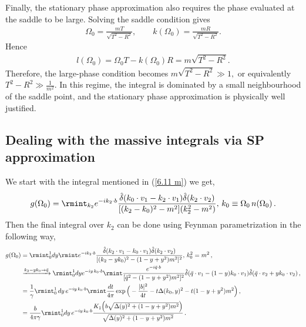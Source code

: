 {{Finally, the stationary phase approximation also requires the phase evaluated at the saddle to be large. Solving the saddle condition gives
\begin{align}
    \Omega_0
    =
    \frac{mT}{\sqrt{T^2-R^2}},
    \qquad
    k(\Omega_0)
    =
    \frac{mR}{\sqrt{T^2-R^2}} .
\end{align}
Hence
\begin{align}
    l(\Omega_0)
    =
    \Omega_0 T-k(\Omega_0)R
    =
    m\sqrt{T^2-R^2}.
\end{align}
Therefore, the large-phase condition becomes   $ m\sqrt{T^2-R^2}\gg 1,$ or equivalently  $  T^2-R^2\gg \frac{1}{m^2}.$ In this regime, the integral is dominated by a small neighbourhood of the saddle point, and the stationary phase approximation is physically well justified.}}
\subsection{Dealing with the massive integrals via SP approximation}
We start with the integral mentioned in (\ref{6.11 m}) we get, 
\begin{align}
    g(\Omega_0)=\rmint_{k_2}e^{-ik_2\cdot b}\frac{\hat\delta(k_0\cdot v_1-k_2\cdot v_1)\hat\delta(k_2\cdot v_2)}{[(k_2-k_0)^2-m^2](k_2^2-m^2)},\,k_0\equiv \Omega_0 \,n({\Omega_0})\,.
\end{align}
Then the final integral over $k_2$ can be done using Feynman parametrization in the following way, 
\begin{align}
    \begin{split}
        g(\Omega_0)&=\rmint_{0}^1 dy\rmint e^{-ik_2\cdot b}\frac{\hat\delta(k_2\cdot v_1-k_0\cdot v_1)\hat\delta(k_2\cdot v_2)}{[(k_2-yk_0)^2-(1-y+y^2)m^2]^2},\,k_0^2=m^2\,,\\ &
        \xrightarrow[]{k_2-yk_0\rightarrow \bar q}\rmint_0^1 dy e^{-iy\,k_0\cdot b}\rmint \frac{e^{-i \bar q\cdot b}}{[\bar q^2-(1-y+y^2)m^2]^2}\hat\delta(\bar q\cdot v_1-(1-y)k_0\cdot v_1)\hat\delta(\bar q\cdot v_2+y k_0\cdot v_2)\,,\\ &
        =\frac{1}{\gamma}\rmint_0^1\,dy\,e^{-iy\,k_0\cdot b}\rmint \frac{dt}{4\pi}\exp\Big(-\frac{|b|^2}{4t}-t\Delta(k_0,y)^2-t(1-y+y^2)m^2\Big)\,,\\ &
        =\frac{b}{4\pi \gamma}\rmint_0^1
dy\,e^{-iy\,k_0\cdot b}\frac{K_1\Big( b\sqrt{\Delta(y)^2+(1-y+y^2)m^2}\Big)}{\sqrt{\Delta(y)^2+(1-y+y^2)m^2}}\,.
\end{split}
\end{align}
